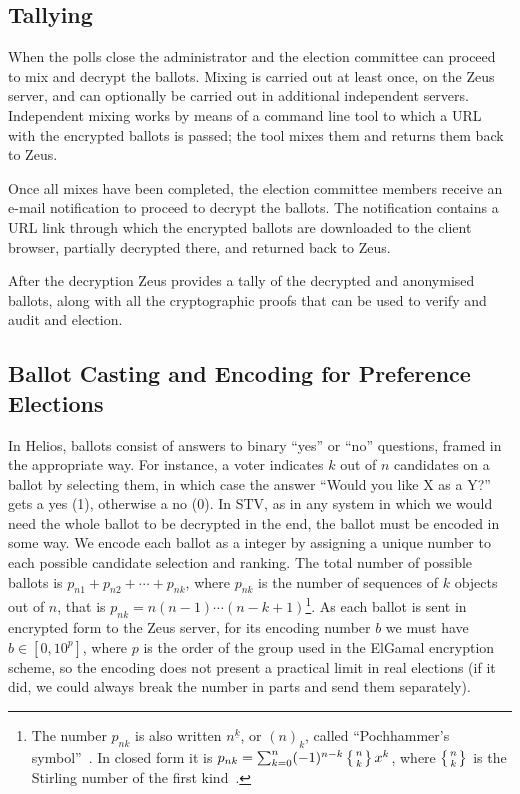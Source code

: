 \documentclass[letterpaper,10pt]{article}
\begin{document}
\subsection{Tallying}

When the polls close the administrator and the election committee can
proceed to mix and decrypt the ballots. Mixing is carried out at least
once, on the Zeus server, and can optionally be carried out in
additional independent servers. Independent mixing works by means of a
command line tool to which a URL with the encrypted ballots is passed;
the tool mixes them and returns them back to Zeus. 

Once all mixes have been completed, the election committee members
receive an e-mail notification to proceed to decrypt the ballots. The
notification contains a URL link through which the encrypted ballots
are downloaded to the client browser, partially decrypted there, and
returned back to Zeus.

After the decryption Zeus provides a tally of the decrypted and
anonymised ballots, along with all the cryptographic proofs that can
be used to verify and audit and election.

\subsection{Ballot Casting and Encoding for Preference Elections}

In Helios, ballots consist of answers to binary ``yes'' or ``no''
questions, framed in the appropriate way. For instance, a voter
indicates $k$ out of $n$ candidates on a ballot by selecting them, in
which case the answer ``Would you like X as a Y?'' gets a yes (1),
otherwise a no (0). In STV, as in any system in which we would need
the whole ballot to be decrypted in the end, the ballot must be
encoded in some way. We encode each ballot as a integer by assigning a
unique number to each possible candidate selection and ranking. The
total number of possible ballots is $p _{n1} + p_{n2} + \cdots + p
_{nk}$, where $p_{nk}$ is the number of sequences of $k$ objects out
of $n$, that is $p_{nk} = n(n - 1)\cdots(n - k + 1)$\footnote{The
  number $p_{nk}$ is also written $n^{\underline{k}}$, or $(n)_k$,
  called ``Pochhammer's symbol''~\cite[p.\ 48]{graham:1994}. In closed
  form it is $p_{nk} = \sum_{k=0}^{n} (-1)^{n-k}\left\{n \atop
    k\right\}x^k$, where $\left\{n \atop k\right\}$ is the Stirling
  number of the first kind~\cite{weisstein:pochhammer}.}. As each
ballot is sent in encrypted form to the Zeus server, for its encoding
number $b$ we must have $b \in [0, 10^p]$, where $p$ is the order of
the group used in the ElGamal encryption scheme, so the encoding does
not present a practical limit in real elections (if it did, we could
always break the number in parts and send them separately).
\end{document}
